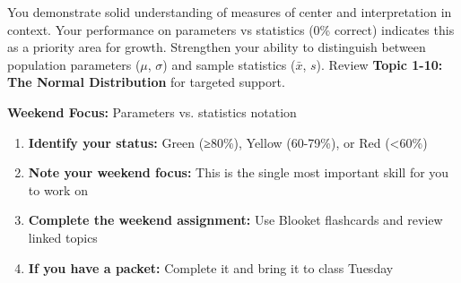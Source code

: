 \documentclass[11pt]{article}
\begin{document}
\vspace{0.15in}

\begin{tcolorbox}[colback=green!5!white,colframe=green!75!black,title=\textbf{Keily} (apricot\_fox) - L10: 5/6 (83\%)]
You demonstrate solid understanding of measures of center and interpretation in context. Your performance on parameters vs statistics (0\% correct) indicates this as a priority area for growth. Strengthen your ability to distinguish between population parameters ($\mu$, $\sigma$) and sample statistics ($\bar{x}$, $s$). Review \textbf{Topic 1-10: The Normal Distribution} for targeted support.

\vspace{0.1in}
\textbf{Weekend Focus:} Parameters vs. statistics notation
\end{tcolorbox}

\vspace{0.3in}

\begin{tcolorbox}[colback=blue!5!white,colframe=blue!75!black,title=\textbf{How to Use This Brief}]
\begin{enumerate}
    \item \textbf{Identify your status:} Green (≥80\%), Yellow (60-79\%), or Red (<60\%)
    \item \textbf{Note your weekend focus:} This is the single most important skill for you to work on
    \item \textbf{Complete the weekend assignment:} Use Blooket flashcards and review linked topics
    \item \textbf{If you have a packet:} Complete it and bring it to class Tuesday
\end{enumerate}
\end{tcolorbox}
\end{document}
